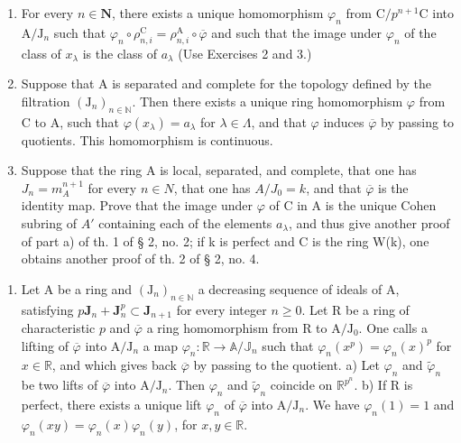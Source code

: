 \begin{enumerate}
\def\labelenumi{\alph{enumi})}
\item
  For every \(n\in\mathbf{N}\), there exists a unique homomorphism \(\varphi_{n}\) from \(\mathrm{C}/p^{n+1}\mathrm{C}\) into \(\mathrm{A}/\mathrm{J}_{n}\) such that \(\varphi_{n}\circ\rho_{n,i}^{\mathrm{C}}=\rho_{n,i}^{\mathrm{A}}\circ\overline{\varphi}\) and such that the image under \(\varphi_{n}\) of the class of \(x_{\lambda}\) is the class of \(a_{\lambda}\) (Use Exercises 2 and 3.)
\item
  Suppose that A is separated and complete for the topology defined by the filtration \((\mathrm{J}_{n})_{n\in\mathbb{N}}\). Then there exists a unique ring homomorphism \(\varphi\) from C to A, such that \(\varphi(x_{\lambda}) = a_{\lambda}\) for \(\lambda \in \Lambda\), and that \(\varphi\) induces \(\overline{\varphi}\) by passing to quotients. This homomorphism is continuous.
\item
  Suppose that the ring A is local, separated, and complete, that one has \(J_{n} = m_{A}^{n+1}\) for every \(n \in N\), that one has \(A/J_{0} = k\), and that \(\overline{\varphi}\) is the identity map. Prove that the image under \(\varphi\) of C in A is the unique Cohen subring of \(A'\) containing each of the elements \(a_{\lambda}\), and thus give another proof of part a) of th. 1 of § 2, no. 2; if k is perfect and C is the ring W(k), one obtains another proof of th. 2 of § 2, no. 4.
\end{enumerate}

\begin{enumerate}
\def\labelenumi{\arabic{enumi})}
\setcounter{enumi}{4}
\tightlist
\item
  Let A be a ring and \((\mathrm{J}_n)_{n\in \mathbb{N}}\) a decreasing sequence of ideals of A, satisfying \(p\mathbf{J}_n + \mathbf{J}_n^p\subset \mathbf{J}_{n + 1}\) for every integer \(n\geqslant 0\). Let R be a ring of characteristic \(p\) and \(\overline{\varphi}\) a ring homomorphism from R to \(\mathrm{A} / \mathrm{J}_0\). One calls a lifting of \(\overline{\varphi}\) into \(\mathrm{A} / \mathrm{J}_n\) a map \(\varphi_n:\mathbb{R}\to \mathbb{A} / \mathbb{J}_n\) such that \(\varphi_n(x^p) = \varphi_n(x)^p\) for \(x\in \mathbb{R}\), and which gives back \(\overline{\varphi}\) by passing to the quotient. a) Let \(\varphi_n\) and \(\widetilde{\varphi}_n\) be two lifts of \(\overline{\varphi}\) into \(\mathrm{A} / \mathrm{J}_n\). Then \(\varphi_n\) and \(\widetilde{\varphi}_n\) coincide on \(\mathbb{R}^{p^n}\). b) If R is perfect, there exists a unique lift \(\varphi_n\) of \(\overline{\varphi}\) into \(\mathrm{A} / \mathrm{J}_n\). We have \(\varphi_n(1) = 1\) and \(\varphi_n(xy) = \varphi_n(x)\varphi_n(y)\), for \(x,y\in \mathbb{R}\).
\end{enumerate}

